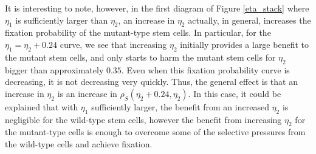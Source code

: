 \documentclass[12pt]{article}
\begin{document}
It is interesting to note, however, in the first diagram of Figure \ref{eta_stack} where $\eta_1$ is sufficiently larger than $\eta_2$, an increase in $\eta_2$ actually, in general, increases the fixation probability of the mutant-type stem cells. In particular, for the $\eta_1=\eta_2+0.24$ curve, we see that increasing $\eta_2$ initially provides a large benefit to the mutant stem cells, and only starts to harm the mutant stem cells for $\eta_2$ bigger than approximately $0.35$. Even when this fixation probability curve is decreasing, it is not decreasing very quickly. Thus, the general effect is that an increase in $\eta_2$ is an increase in $\rho_S(\eta_2+0.24, \eta_2)$. In this case, it could be explained that with $\eta_1$ sufficiently larger, the benefit from an increased $\eta_2$ is negligible for the wild-type stem cells, however the benefit from increasing $\eta_2$ for the mutant-type cells is enough to overcome some of the selective pressures from the wild-type cells and achieve fixation.
\end{document}
